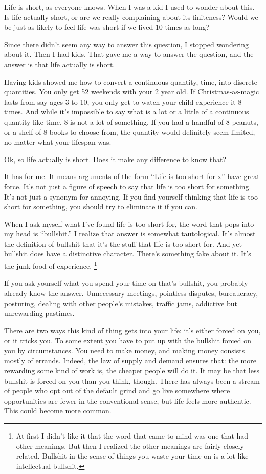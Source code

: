 \documentclass[12pt]{book}
\begin{document}
Life is short, as everyone knows. When I was a kid I used to wonder
about this. Is life actually short, or are we really complaining about
its finiteness? Would we be just as likely to feel life was short if we
lived 10 times as long?

Since there didn't seem any way to answer this question, I stopped
wondering about it. Then I had kids. That gave me a way to answer the
question, and the answer is that life actually is short.

Having kids showed me how to convert a continuous quantity, time, into
discrete quantities. You only get 52 weekends with your 2 year old. If
Christmas-as-magic lasts from say ages 3 to 10, you only get to watch
your child experience it 8 times. And while it's impossible to say what
is a lot or a little of a continuous quantity like time, 8 is not a lot
of something. If you had a handful of 8 peanuts, or a shelf of 8 books
to choose from, the quantity would definitely seem limited, no matter
what your lifespan was.

Ok, so life actually is short. Does it make any difference to know that?

It has for me. It means arguments of the form ``Life is too short for
x'' have great force. It's not just a figure of speech to say that life
is too short for something. It's not just a synonym for annoying. If you
find yourself thinking that life is too short for something, you should
try to eliminate it if you can.

When I ask myself what I've found life is too short for, the word that
pops into my head is ``bullshit.'' I realize that answer is somewhat
tautological. It's almost the definition of bullshit that it's the stuff
that life is too short for. And yet bullshit does have a distinctive
character. There's something fake about it. It's the junk food of
experience. \footnote{At first I didn't like it that the word that came to mind was
one that had other meanings. But then I realized the other meanings are
fairly closely related. Bullshit in the sense of things you waste your
time on is a lot like intellectual bullshit.}

If you ask yourself what you spend your time on that's bullshit, you
probably already know the answer. Unnecessary meetings, pointless
disputes, bureaucracy, posturing, dealing with other people's mistakes,
traffic jams, addictive but unrewarding pastimes.

There are two ways this kind of thing gets into your life: it's either
forced on you, or it tricks you. To some extent you have to put up with
the bullshit forced on you by circumstances. You need to make money, and
making money consists mostly of errands. Indeed, the law of supply and
demand ensures that: the more rewarding some kind of work is, the
cheaper people will do it. It may be that less bullshit is forced on you
than you think, though. There has always been a stream of people who opt
out of the default grind and go live somewhere where opportunities are
fewer in the conventional sense, but life feels more authentic. This
could become more common.
\end{document}
